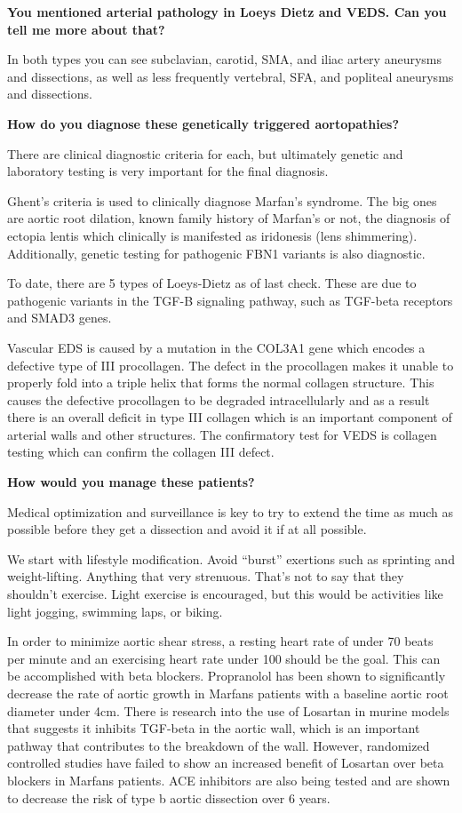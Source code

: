 \documentclass[
]{book}
\begin{document}
\textbf{You mentioned arterial pathology in Loeys Dietz and VEDS. Can you tell
me more about that?}

In both types you can see subclavian, carotid, SMA, and iliac artery
aneurysms and dissections, as well as less frequently vertebral, SFA,
and popliteal aneurysms and dissections.

\textbf{How do you diagnose these genetically triggered aortopathies?}

There are clinical diagnostic criteria for each, but ultimately genetic
and laboratory testing is very important for the final diagnosis.

Ghent's criteria is used to clinically diagnose Marfan's syndrome. The
big ones are aortic root dilation, known family history of Marfan's or
not, the diagnosis of ectopia lentis which clinically is manifested as
iridonesis (lens shimmering). Additionally, genetic testing for
pathogenic FBN1 variants is also diagnostic.

To date, there are 5 types of Loeys-Dietz as of last check. These are
due to pathogenic variants in the TGF-B signaling pathway, such as
TGF-beta receptors and SMAD3 genes.

Vascular EDS is caused by a mutation in the COL3A1 gene which encodes a
defective type of III procollagen. The defect in the procollagen makes
it unable to properly fold into a triple helix that forms the normal
collagen structure. This causes the defective procollagen to be degraded
intracellularly and as a result there is an overall deficit in type III
collagen which is an important component of arterial walls and other
structures. The confirmatory test for VEDS is collagen testing which can
confirm the collagen III defect.

\textbf{How would you manage these patients?}

Medical optimization and surveillance is key to try to extend the time
as much as possible before they get a dissection and avoid it if at all
possible.

We start with lifestyle modification. Avoid ``burst'' exertions such as
sprinting and weight-lifting. Anything that very strenuous. That's not
to say that they shouldn't exercise. Light exercise is encouraged, but
this would be activities like light jogging, swimming laps, or biking.

In order to minimize aortic shear stress, a resting heart rate of under
70 beats per minute and an exercising heart rate under 100 should be the
goal. This can be accomplished with beta blockers. Propranolol has been
shown to significantly decrease the rate of aortic growth in Marfans
patients with a baseline aortic root diameter under 4cm. There is
research into the use of Losartan in murine models that suggests it
inhibits TGF-beta in the aortic wall, which is an important pathway that
contributes to the breakdown of the wall. However, randomized controlled
studies have failed to show an increased benefit of Losartan over beta
blockers in Marfans patients. ACE inhibitors are also being tested and
are shown to decrease the risk of type b aortic dissection over 6 years.
\end{document}
